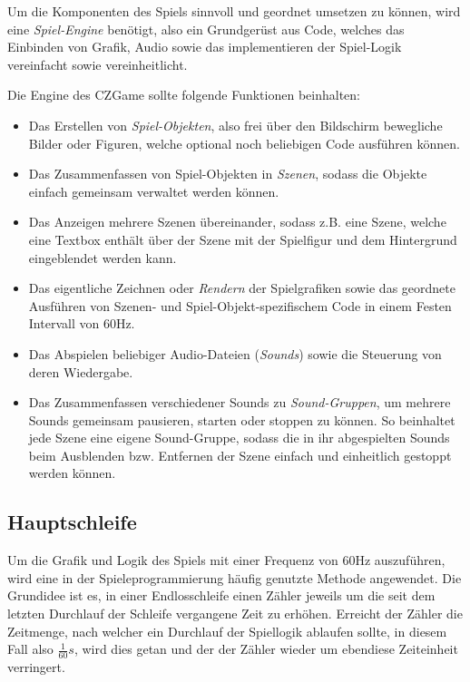 Um die Komponenten des Spiels sinnvoll und geordnet umsetzen zu
können, wird eine \textit{Spiel-Engine} benötigt, also ein
Grundgerüst aus Code, welches das Einbinden von Grafik, Audio sowie
das implementieren der Spiel-Logik vereinfacht sowie vereinheitlicht.

Die Engine des CZGame sollte folgende Funktionen
beinhalten:

\begin{itemize}
	\item Das Erstellen von \textit{Spiel-Objekten}, also
	frei über den Bildschirm bewegliche Bilder oder Figuren,
	welche optional noch beliebigen Code ausführen können.
	\item Das Zusammenfassen von Spiel-Objekten in \textit{Szenen},
	sodass die Objekte einfach gemeinsam verwaltet werden können.
	\item Das Anzeigen mehrere Szenen übereinander, sodass z.B.
	eine Szene, welche eine Textbox enthält über der Szene mit
	der Spielfigur und dem Hintergrund eingeblendet werden kann.
	\item Das eigentliche \glqq{}Zeichnen\grqq{} oder \textit{Rendern} der Spielgrafiken
	sowie das geordnete Ausführen von Szenen- und Spiel-Objekt-spezifischem
	Code in einem Festen Intervall von 60Hz.
	\item Das Abspielen beliebiger Audio-Dateien (\textit{Sounds})
	sowie die Steuerung von deren Wiedergabe.
	\item Das Zusammenfassen verschiedener Sounds zu \textit{Sound-Gruppen},
	um mehrere Sounds gemeinsam pausieren, starten oder stoppen zu können.
	So beinhaltet jede Szene eine eigene Sound-Gruppe, sodass die in ihr
	abgespielten Sounds beim Ausblenden bzw. Entfernen der Szene einfach
	und einheitlich gestoppt werden können.
\end{itemize}


\subsection{Hauptschleife} \label{idee:engine:hauptschleife}

Um die Grafik und Logik des Spiels mit einer Frequenz von 60Hz
auszuführen, wird eine in der Spieleprogrammierung häufig
genutzte Methode angewendet. Die Grundidee ist es, in einer
Endlosschleife einen Zähler jeweils um die seit dem letzten
Durchlauf der Schleife vergangene Zeit zu erhöhen. Erreicht der
Zähler die Zeitmenge, nach welcher ein Durchlauf der Spiellogik
ablaufen sollte, in diesem Fall also $\frac{1}{60}s$, wird dies
getan und der der Zähler wieder um ebendiese Zeiteinheit verringert.

